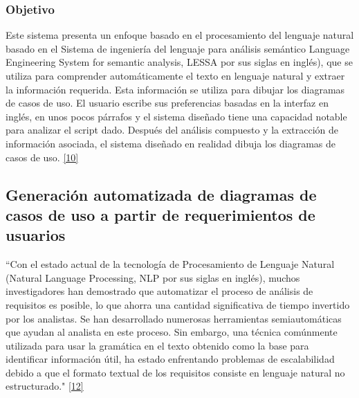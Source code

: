 \subsubsection{Objetivo}
Este sistema presenta un enfoque basado en el procesamiento del lenguaje natural basado en el Sistema de ingeniería del lenguaje para análisis semántico Language Engineering System for semantic analysis, LESSA por sus siglas en inglés), que se utiliza para comprender automáticamente el texto en lenguaje natural y extraer la información requerida. Esta información se utiliza para dibujar los diagramas de casos de uso. El usuario escribe sus preferencias basadas en la interfaz en inglés, en unos pocos párrafos y el sistema diseñado tiene una capacidad notable para analizar el script dado. Después del análisis compuesto y la extracción de información asociada, el sistema diseñado en realidad dibuja los diagramas de casos de uso. \hyperlink{b10}{[10]}

\subsection{Generación automatizada de diagramas de casos de uso a partir de requerimientos de usuarios}

``Con el estado actual de la tecnología de Procesamiento de Lenguaje Natural (Natural Language Processing, NLP por sus siglas en inglés), muchos investigadores han demostrado que automatizar el proceso de análisis de requisitos es posible, lo que ahorra una cantidad significativa de tiempo invertido por los analistas. Se han desarrollado numerosas herramientas semiautomáticas que ayudan al analista en este proceso. Sin embargo, una técnica comúnmente utilizada para usar la gramática en el texto obtenido como la base para identificar información útil, ha estado enfrentando problemas de escalabilidad debido a que el formato textual de los requisitos consiste en lenguaje natural no estructurado." \hyperlink{b12}{[12]}


